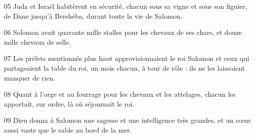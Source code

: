 
05 Juda et Israël habitèrent en sécurité, chacun sous sa vigne et sous son figuier, de Dane jusqu’à Bershéba, durant toute la vie de Salomon.

06 Salomon avait quarante mille stalles pour les chevaux de ses chars, et douze mille chevaux de selle.

07 Les préfets mentionnés plus haut approvisionnaient le roi Salomon et ceux qui partageaient la table du roi, un mois chacun, à tour de rôle : ils ne les laissaient manquer de rien.

08 Quant à l’orge et au fourrage pour les chevaux et les attelages, chacun les apportait, sur ordre, là où séjournait le roi.

09 Dieu donna à Salomon une sagesse et une intelligence très grandes, et un cœur aussi vaste que le sable au bord de la mer.
